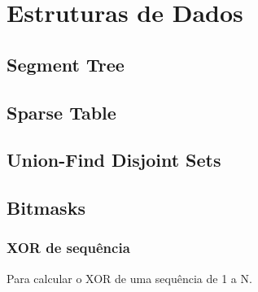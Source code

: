 \section{Estruturas de Dados}

\subsection{Segment Tree}
\divisor

\subsection{Sparse Table}
\divisor

\subsection{Union-Find Disjoint Sets}
\divisor

\subsection{Bitmasks}
\subsubsection{XOR de sequ\^{e}ncia}
Para calcular o XOR de uma sequ\^{e}ncia de 1 a N.
\divisor
